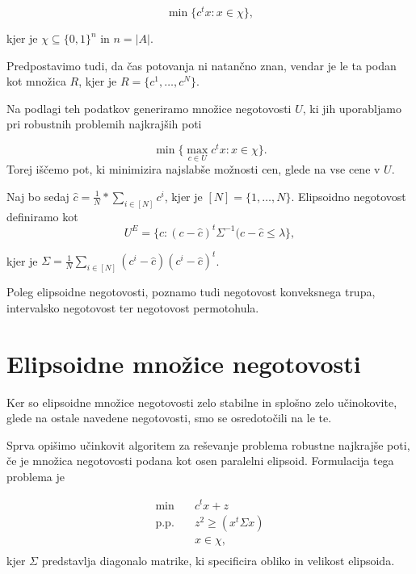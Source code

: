 \documentclass[a4paper, 12 pt]{article}
\theoremstyle{definition} %
\theoremstyle{plain} %
\theoremstyle{definition}
\begin{document}
\begin{equation*}
\min \{c^t x : x \in \chi \},
\end{equation*}

kjer je $\chi \subseteq \{0,1\}^n$ in $n = |A|$.

Predpostavimo tudi, da čas potovanja ni natančno znan, vendar je le ta podan kot množica $R$, kjer je $R = \{c^1, \dots, c^N \}$.

Na podlagi teh podatkov generiramo množice negotovosti $U$, ki jih uporabljamo pri robustnih problemih najkrajših poti

\begin{equation*}
\min \{\max \limits_{c \in U} c^t x : x \in \chi \}.
\end{equation*}
 Torej iščemo pot, ki minimizira najslabše možnosti cen, glede na vse cene v $U$.

\bigskip

Naj bo sedaj $\hat{c} = \frac{1}{N} * \sum_{i \in [N]} c^i $, kjer je $[N] = \{1, \dots , N \}$. Elipsoidno negotovost definiramo kot
\begin{equation*}
U^E = \{c: (c - \hat{c})^t \Sigma ^{-1} (c - \hat{c}	\le \lambda \},
\end{equation*}

kjer je $\Sigma = \frac{1}{N} \sum_{i \in [N]} (c^i -\hat{c}) (c^i -\hat{c})^t$.

\bigskip
Poleg elipsoidne negotovosti, poznamo tudi negotovost konveksnega trupa, intervalsko negotovost ter negotovost permotohula. 
\pagebreak
\section{Elipsoidne množice negotovosti}
Ker so elipsoidne množice negotovosti zelo stabilne in splošno zelo učinokovite, glede na ostale navedene negotovosti, smo se osredotočili na le te.

Sprva opišimo učinkovit algoritem za reševanje problema robustne najkrajše poti, če je množica negotovosti podana kot osen paralelni elipsoid. Formulacija tega problema je

\begin{equation*}
\begin{aligned}
\min \quad &  \hat{c}^t x + z\\
\textrm{p.p.} \quad & {z}^2 \geq (x^t \Sigma x )\\
& x \in \chi,\\
\end{aligned}
\end{equation*}
 kjer $\Sigma$ predstavlja diagonalo matrike, ki specificira obliko in velikost elipsoida. \newline
\end{document}
